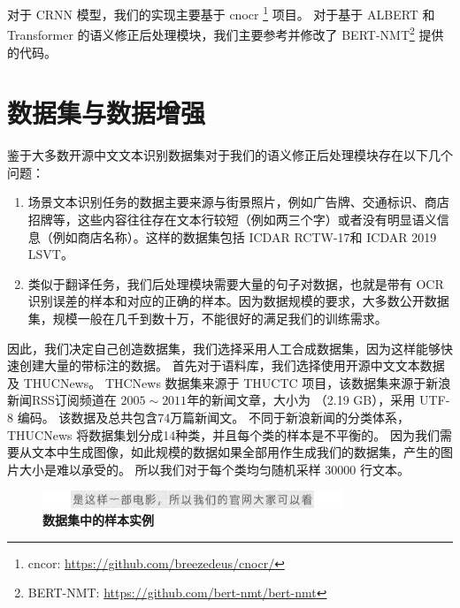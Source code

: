 对于 CRNN 模型，我们的实现主要基于 cnocr \footnote{cncor: \url{https://github.com/breezedeus/cnocr/}} 项目。
对于基于 ALBERT 和 Transformer 的语义修正后处理模块，我们主要参考并修改了 BERT-NMT\footnote{BERT-NMT: \url{https://github.com/bert-nmt/bert-nmt}} 提供的代码。


\section{数据集与数据增强}
\label{dataset}
鉴于大多数开源中文文本识别数据集对于我们的语义修正后处理模块存在以下几个问题：

\begin{enumerate}[(1)]
	\item 场景文本识别任务的数据主要来源与街景照片，例如广告牌、交通标识、商店招牌等，这些内容往往存在文本行较短（例如两三个字）或者没有明显语义信息（例如商店名称）。这样的数据集包括 ICDAR RCTW-17\cite{RCTW}和 ICDAR 2019 LSVT\cite{lsvt}。
	\item 类似于翻译任务，我们后处理模块需要大量的句子对数据，也就是带有 OCR 识别误差的样本和对应的正确的样本。因为数据规模的要求，大多数公开数据集，规模一般在几千到数十万，不能很好的满足我们的训练需求。
\end{enumerate}

因此，我们决定自己创造数据集，我们选择采用人工合成数据集，因为这样能够快速创建大量的带标注的数据。
首先对于语料库，我们选择使用开源中文文本数据及 THUCNews。
THCNews 数据集来源于 THUCTC\cite{sum2016thuctc} 项目，该数据集来源于新浪新闻RSS订阅频道在 $2005 \sim 2011$年的新闻文章，大小为 （2.19 GB），采用 UTF-8 编码。
该数据及总共包含74万篇新闻文。
不同于新浪新闻的分类体系，THUCNews 将数据集划分成14种类，并且每个类的样本是不平衡的。
因为我们需要从文本中生成图像，如此规模的数据如果全部用作生成我们的数据集，产生的图片大小是难以承受的。
所以我们对于每个类均匀随机采样 $30000$ 行文本。

\begin{figure}[h!]
	\centering
	\includegraphics[width=0.8\textwidth]{figure/resources/sample.png}
	\caption{\textbf{数据集中的样本实例}\label{sample}}
\end{figure}

